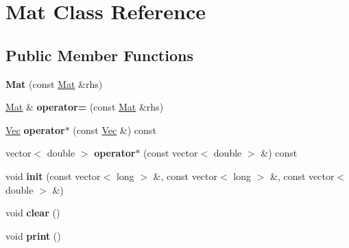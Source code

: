 \hypertarget{classMat}{}\section{Mat Class Reference}
\label{classMat}
\subsection*{Public Member Functions}
\begin{DoxyCompactItemize}
\item 
{\bfseries Mat} (const \hyperlink{classMat}{Mat} \&rhs)\hypertarget{classMat_a689281bd62fd71097b8918a474baa03c}{}\label{classMat_a689281bd62fd71097b8918a474baa03c}

\item 
\hyperlink{classMat}{Mat} \& {\bfseries operator=} (const \hyperlink{classMat}{Mat} \&rhs)\hypertarget{classMat_ac5b996c2119fd4dfbcca681783471d06}{}\label{classMat_ac5b996c2119fd4dfbcca681783471d06}

\item 
\hyperlink{classVec}{Vec} {\bfseries operator$\ast$} (const \hyperlink{classVec}{Vec} \&) const \hypertarget{classMat_a96feace30905a807d746874106a917f1}{}\label{classMat_a96feace30905a807d746874106a917f1}

\item 
vector$<$ double $>$ {\bfseries operator$\ast$} (const vector$<$ double $>$ \&) const \hypertarget{classMat_a3c304227fd231e496d645522db714b5a}{}\label{classMat_a3c304227fd231e496d645522db714b5a}

\item 
void {\bfseries init} (const vector$<$ long $>$ \&, const vector$<$ long $>$ \&, const vector$<$ double $>$ \&)\hypertarget{classMat_a49db8fb674f8dd5f76bb6f7c710fa125}{}\label{classMat_a49db8fb674f8dd5f76bb6f7c710fa125}

\item 
void {\bfseries clear} ()\hypertarget{classMat_afccb6843f949660582b77cf677c7aee2}{}\label{classMat_afccb6843f949660582b77cf677c7aee2}

\item 
void {\bfseries print} ()\hypertarget{classMat_ab44133772f822f6963924b1a6e94290a}{}\label{classMat_ab44133772f822f6963924b1a6e94290a}

\end{DoxyCompactItemize}
